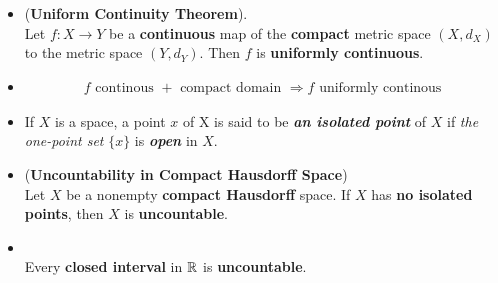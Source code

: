 \documentclass[11pt]{article}
\begin{document}
\begin{itemize}
\item \begin{theorem} (\textbf{Uniform Continuity Theorem}). \citep{munkres2000topology} \\
 Let $f: X \rightarrow Y$ be a \textbf{continuous} map of the \textbf{compact} metric space $(X, d_X) $ to the metric space $(Y, d_Y)$. Then $f$ is \textbf{uniformly continuous}.
\end{theorem}


\item \begin{remark}
\begin{align*}
f\text{ continous } + \text{ compact domain } \Rightarrow f\text{ uniformly continous }
\end{align*}
\end{remark}


\item \begin{definition}
If $X$ is a space, a point $x$ of X is said to be \emph{\textbf{an isolated point}} of $X$ if \emph{the one-point set} $\{x\}$ is \emph{\textbf{open}} in $X$.
\end{definition}

\item \begin{theorem} (\textbf{Uncountability in Compact Hausdorff Space}) \citep{munkres2000topology}\\
Let $X$ be a nonempty \textbf{compact Hausdorff} space. If $X$ has \textbf{no isolated points}, then $X$ is \textbf{uncountable}.
\end{theorem}


\item \begin{corollary} \citep{munkres2000topology}\\
Every \textbf{closed interval} in ${\mathbb R}$ is \textbf{uncountable}.
\end{corollary}


\end{itemize}
\end{document}
